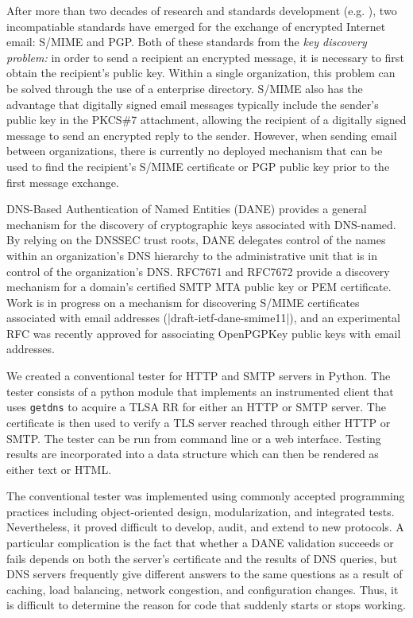 \documentclass[preprint,3p]{elsarticle}
\begin{document}
After more than two decades of research and standards development
(e.g. \cite{rfc1421,rfc4880,rfc5750}), two incompatiable standards
have emerged for the exchange of encrypted Internet email: S/MIME and
PGP. Both of these standards from the \emph{key discovery problem:} in
order to send a recipient an encrypted message, it is necessary to
first obtain the recipient's public key. Within a single organization,
this problem can be solved through the use of a enterprise
directory. S/MIME also has the advantage that digitally signed email
messages typically include the sender's public key in the PKCS\#7
attachment\cite{rfc2315}, allowing the recipient of a digitally signed
message to send an encrypted reply to the sender. However, when
sending email between organizations, there is currently no deployed
mechanism that can be used to find the recipient's S/MIME certificate
or PGP public key prior to the first message exchange.

DNS-Based Authentication of Named
Entities\cite{rfc7671} (DANE) provides a general mechanism for the
discovery of cryptographic keys associated with DNS-named. By relying
on the DNSSEC\cite{rfc3833} trust roots, DANE delegates control of the
names within an organization's DNS hierarchy to the administrative
unit that is in control of the organization's DNS. RFC7671 and RFC7672 provide a
discovery mechanism for a domain's certified SMTP MTA public key or
PEM certificate\cite{rfc7671,rfc7672}. Work is in progress on a mechanism for discovering
S/MIME certificates associated with email addresses
(|draft-ietf-dane-smime11|), and 
an experimental RFC was recently approved for associating OpenPGPKey public keys with email addresses\cite{rfc7929}.

We created a conventional tester for HTTP and SMTP servers in
Python. The tester consists of a python module that implements an
instrumented client that uses \texttt{getdns}\cite{getdns} to acquire a TLSA RR for either
an HTTP or SMTP server. The certificate is then used to verify a TLS
server reached through either HTTP or SMTP. The tester can be run from
command line or a web interface. Testing results are incorporated into
a data structure which can then be rendered as either text or HTML.

The conventional tester was implemented using commonly accepted
programming practices including object-oriented design,
modularization, and integrated tests. Nevertheless, it proved
difficult to develop, audit, and extend to new protocols. A particular
complication is the fact that whether a DANE validation succeeds or
fails depends on both the server's certificate and the results of DNS
queries, but DNS servers frequently give different answers to the same
questions as a result of caching, load balancing, network congestion,
and configuration changes. Thus, it is difficult to determine the
reason for code that suddenly starts or stops working.
\end{document}

